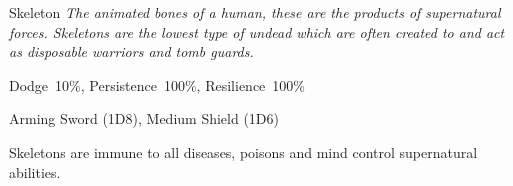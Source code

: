\begin{monsterbox}{Skeleton}
	\textit{The animated bones of a human, these are the products of supernatural forces. Skeletons are the lowest type of undead which are often created to and act as disposable warriors and tomb guards.}\\
	\rpghline
	\basics[%
        hitpoints  = 8, 
	majorwound = 4,
	damagemodifier = 0,
	powerpoints = 0,
	movementrate = 15m,
	armor = Leather (2AP),
	plunderrating = 0
	]
	\rpghline%
	\stats[ %
		STR = 2D6+6 (13),
		CON = 1D6   (4),
		DEX = 3D6   (11),
		SIZ = 3D6   (11),
		INT = 0     (0),
		POW = 0     (0),
		CHA = 0     (0)
	]
	\rpghline%
	\begin{rpg-monsteraction}[Resistances]
		Dodge~10\%, Persistence~100\%, Resilience~100\%
	\end{rpg-monsteraction}
	\begin{rpg-monsteraction}
		Arming Sword (1D8), Medium Shield (1D6)
	\end{rpg-monsteraction}
	\begin{rpg-monsteraction}[Immunities]
		Skeletons are immune to all diseases, poisons and mind control supernatural abilities.
	\end{rpg-monsteraction}

\end{monsterbox}



